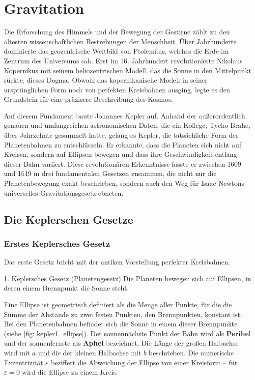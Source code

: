 \chapter{Gravitation}\label{chap: gravitation}

Die Erforschung des Himmels und der Bewegung der Gestirne zählt zu den ältesten wissenschaftlichen Bestrebungen der Menschheit. Über Jahrhunderte dominierte das geozentrische Weltbild von Ptolemäus, welches die Erde im Zentrum des Universums sah. Erst im 16. Jahrhundert revolutionierte Nikolaus Kopernikus mit seinem heliozentrischen Modell, das die Sonne in den Mittelpunkt rückte, dieses Dogma. Obwohl das kopernikanische Modell in seiner ursprünglichen Form noch von perfekten Kreisbahnen ausging, legte es den Grundstein für eine präzisere Beschreibung des Kosmos.

Auf diesem Fundament baute Johannes Kepler auf. Anhand der außerordentlich genauen und umfangreichen astronomischen Daten, die ein Kollege, Tycho Brahe, über Jahrzehnte gesammelt hatte, gelang es Kepler, die tatsächliche Form der Planetenbahnen zu entschlüsseln. Er erkannte, dass die Planeten sich nicht auf Kreisen, sondern auf Ellipsen bewegen und dass ihre Geschwindigkeit entlang dieser Bahn variiert. Diese revolutionären Erkenntnisse fasste er zwischen 1609 und 1619 in drei fundamentalen Gesetzen zusammen, die nicht nur die Planetenbewegung exakt beschrieben, sondern auch den Weg für Isaac Newtons universelles Gravitationsgesetz ebneten.

\section{Die Keplerschen Gesetze}\label{sec: keplerschen_gesetze}

\subsection{Erstes Keplersches Gesetz}\label{subsec: kepler1}
Das erste Gesetz bricht mit der antiken Vorstellung perfekter Kreisbahnen.

\begin{rememberbox}[]{1. Keplersches Gesetz (Planetengesetz)}
Die Planeten bewegen sich auf Ellipsen, in deren einem Brennpunkt die Sonne steht. 
\end{rememberbox}

Eine Ellipse ist geometrisch definiert als die Menge aller Punkte, für die die Summe der Abstände zu zwei festen Punkten, den Brennpunkten, konstant ist. Bei den Planetenbahnen befindet sich die Sonne in einem dieser Brennpunkte (siehe \cref{fig: kepler1_ellipse}). Der sonnennächste Punkt der Bahn wird als \textbf{Perihel} und der sonnenfernste als \textbf{Aphel} bezeichnet. Die Länge der großen Halbachse wird mit $a$ und die der kleinen Halbachse mit $b$ beschrieben. Die numerische Exzentrizität $\varepsilon$ beziffert die Abweichung der Ellipse von einer Kreisform -- für $\varepsilon = 0$ wird die Ellipse zu einem Kreis.

